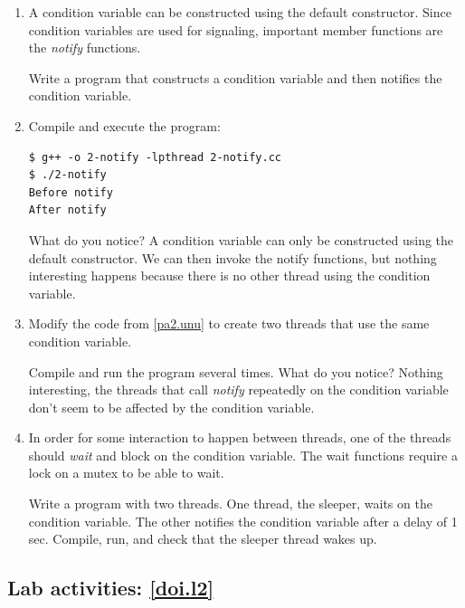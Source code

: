 \documentclass[12pt]{book}
\begin{document}
\begin{enumerate}[label=Activity \arabic*:]

\item\label{pa2.unu} A condition variable can be constructed using the default constructor. Since condition variables are used for signaling, important  member functions are the \emph{notify} functions. 

  Write a program that constructs a condition variable and then notifies the condition variable.

  

\item Compile and execute the program:

  \begin{lstlisting}
$ g++ -o 2-notify -lpthread 2-notify.cc 
$ ./2-notify 
Before notify
After notify
  \end{lstlisting}

  What do you notice? A condition variable can only be constructed using the default constructor. We can then invoke the notify functions, but nothing interesting happens because there is no other thread using the condition variable.

\item Modify the code from \ref{pa2.unu} to create two threads that use the same condition variable.

  

  Compile and run the program several times. What do you notice? Nothing interesting, the threads that call \emph{notify} repeatedly on the condition variable don't seem to be affected by the condition variable.

\item In order for some interaction to happen between threads, one of the threads should \emph{wait} and block on the condition variable. The wait functions require a lock on a mutex to be able to wait.

  Write a program with two threads. One thread, the sleeper, waits on the condition variable. The other notifies the condition variable after a delay of 1 sec. Compile, run, and check that the sleeper thread wakes up.

  
\end{enumerate}

\subsection{Lab activities: \ref{doi.l2}}\label{wakesleep.se}
\end{document}
